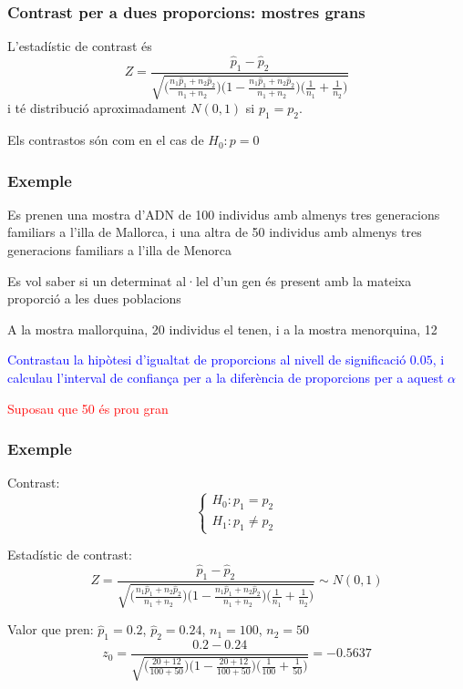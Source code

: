 \documentclass[12pt,t]{beamer}\usepackage[]{graphicx}\usepackage[]{color}
\newcommand{\red}[1]{\textcolor{red}{#1}}
\newcommand{\blue}[1]{\textcolor{blue}{#1}}
\renewcommand{\emph}[1]{{\color{red}#1}}
\theoremstyle{plain}
\theoremstyle{definition}
\begin{document}
\begin{frame}
\frametitle{Contrast per a dues proporcions: mostres grans}

L'estadístic de contrast és
$$
Z=\frac{\widehat{p}_1 -\widehat{p}_2}{
\sqrt{\Big(\frac{n_1 \widehat{p}_1 +n_2 \widehat{p}_2}{n_1
+n_2}\Big)\Big(1-\frac{n_1 \widehat{p}_1 +n_2 \widehat{p}_2}{n_1
+n_2}\Big)\Big(\frac{1}{n_1}+\frac{1}{n_2}
\Big)}}$$
i té distribució aproximadament $N(0,1)$ si $p_1=p_2$.
\bigskip

Els contrastos són com en el cas de $H_0:p=0$

\end{frame}
\begin{frame}
\frametitle{Exemple}

Es prenen una mostra d'ADN de 100 individus amb almenys tres generacions
familiars a l'illa de Mallorca, i una altra de 50 individus amb almenys tres generacions
familiars a l'illa de  Menorca
\medskip

Es vol saber si un determinat al·lel d'un gen és present amb la mateixa proporció a les dues poblacions
\medskip

A la mostra mallorquina, 20 individus el tenen, i a la mostra menorquina, 12
\medskip

\blue{Contrastau la hipòtesi d'igualtat de proporcions al
nivell de significació $0.05$, i calculau l'interval de
confiança per a la diferència de proporcions per a aquest $\alpha$} 
\medskip

\red{Suposau que 50 és prou gran}



\end{frame}
\begin{frame}
\frametitle{Exemple}


\emph{Contrast}:
$$
\left\{\begin{array}{l}
H_0:p_1=p_2\\
H_1:p_1\neq p_2
\end{array}\right.
$$

\emph{Estadístic de contrast}: 
$$
Z=\frac{\widehat{p}_1 -\widehat{p}_2}{
\sqrt{\Big(\frac{n_1 \widehat{p}_1 +n_2 \widehat{p}_2}{n_1
+n_2}\Big)\Big(1-\frac{n_1 \widehat{p}_1 +n_2 \widehat{p}_2}{n_1
+n_2}\Big)\Big(\frac{1}{n_1}+\frac{1}{n_2}
\Big)}}\sim N(0,1)$$
\medskip

\emph{Valor que pren}: $\widehat{p}_1=0.2$, $\widehat{p}_2=0.24$, $n_1=100$, $n_2=50$
$$
z_0=\frac{0.2 -0.24}{
\sqrt{\Big(\frac{20 +12}{100+50}\Big)\Big(1-\frac{20 +12}{100+50}\Big)\Big(\frac{1}{100}+\frac{1}{50}
\Big)}}
=-0.5637$$

\end{frame}
\end{document}
